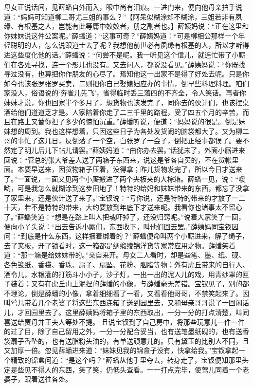 \documentclass[12pt,oneside]{book}
\begin{document}
母女正说话间，见薛蟠自外而入，眼中尚有泪痕。一进门来，便向他母亲拍手说道：“妈妈可知道柳二哥尤三姐的事么？”【阿呆似糊涂却不糊涂，三姐若非有夙缘、有根基之人，岂能有此等庸中姣姣者，册之副者也。】薛姨妈说：“正在这里和你妹妹说这件公案呢。”薛蟠道：“这事可奇？”薛姨妈道：“可是柳相公那样一个年轻聪明的人，怎么说跟道士去了呢？我想他前世必有夙缘有根基的人，所以才听得进这些度化他的话。”薛蟠说：“何尝不是呢。我一听见这个信儿，就连忙带了小厮们在各处寻找，连一个影儿也没有。又去问人，都说没看见。”薛姨妈说：“你既找寻过没有，也算把你作朋友的心尽了。焉知他这一出家不是得了好处去呢。只是你如今也该张罗张罗买卖，二则把你自己娶媳妇应办的事情，倒早些料理料理。咱们家没人，俗语说的‘夯雀儿先飞’，省得临时丢三落四的不齐全，令人笑话。再者你妹妹才说，你也回家半个多月了，想货物也该发完了，同你去的伙计们，也该摆桌酒给他们道道乏才是。人家陪着你走了二三千里的路程，受了四五个月的辛苦，而且在路上又替你担了多少的惊怕沉重。”薛蟠听说，便道：“妈妈说的很是。倒是妹妹想的周到。我也这样想着，只因这些日子为各处发货闹的脑袋都大了。又为柳二哥的事忙了这几日，反倒落了一个空，白张罗了一会子，倒把正经事都误了。要不然定了明儿后儿下帖儿请罢。”薛姨妈道：“由你办去罢。”话犹未了，外面小厮进来回说：“管总的张大爷差人送了两箱子东西来，说这是爷各自买的，不在货帐里面。本要早送来，因货物箱子压着，没得拿；昨儿货物发完了，所以今日才送来了。”一面说，一面又见两个小厮搬进了两个夹板夹的大棕箱。薛蟠一见，说：“嗳哟，可是我怎么就糊涂到这步田地了！特特的给妈和妹妹带来的东西，都忘了没拿了家里来，还是伙计送了来了。”宝钗说：“亏你说，还是特特的带来的才放了一二十天，若不是特特的带来，大约要放到年底下才送来呢。我看你也诸事太不留心了。”薛蟠笑道：“想是在路上叫人把魂吓掉了，还没归窍呢。”说着大家笑了一回，便向小丫头说：“出去告诉小厮们，东西收下，叫他们回去罢。”薛姨妈同宝钗因问：“到底是什么东西，这样捆着绑着的？”薛蟠便命叫两个小厮进来，解了绳子，去了夹板，开了锁看时，这一箱都是绸缎绫锦洋货等家常应用之物。薛蟠笑着道：“那一箱是给妹妹带的。”亲自来开。母女二人看时，却是些笔、墨、纸、砚、各色笺纸、香袋、香珠、扇子、扇坠、花粉、胭脂等物；外有虎丘带来的自行人、酒令儿，水银灌的打筋斗小小子，沙子灯，一出一出的泥人儿的戏，用青纱罩的匣子装着；又有在虎丘山上泥捏的薛蟠的小像，与薛蟠毫无差错。宝钗见了，别的都不理论，倒是薛蟠的小像，拿着细细看了一看，又看看他哥哥，不禁笑起来了。因叫莺儿带着几个老婆子将这些东西连箱子送到园里去，又和母亲哥哥说了一回闲话儿，才回园里去了。这里薛姨妈将箱子里的东西取出，一分一分的打点清楚，叫同喜送给贾母并王夫人等处不提。
且说宝钗到了自己房中，将那些玩意儿一件一件的过了目，除了自己留用之外，一分一分配合妥当，也有送笔墨纸砚的，也有送香袋扇子香坠的，也有送脂粉头油的，有单送顽意儿的。只有黛玉的比别人不同，且又加厚一倍。忽见薛蟠进来道：“妹妹见我的锦盒子没有，快拿给我。”宝钗拿起一个精致的锦盒问道：“是这个吗？”薛蟠从他手里夺去，转身走了，宝钗便知那里头定是些见不得人的东西，笑了笑，仍低头查看。一一打点完毕，使莺儿同着一个老婆子，跟着送往各处。　　
\end{document}
